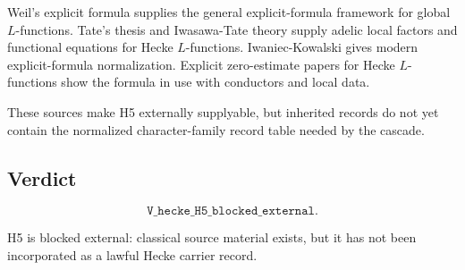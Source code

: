 Weil's explicit formula supplies the general explicit-formula framework for
global \(L\)-functions. Tate's thesis and Iwasawa-Tate theory supply adelic
local factors and functional equations for Hecke \(L\)-functions.
Iwaniec-Kowalski gives modern explicit-formula normalization. Explicit
zero-estimate papers for Hecke \(L\)-functions show the formula in use with
conductors and local data.

These sources make H5 externally supplyable, but inherited records do not yet
contain the normalized character-family record table needed by the cascade.

\subsection*{Verdict}

\[
\texttt{V\_hecke\_H5\_blocked\_external}.
\]

H5 is blocked external: classical source material exists, but it has not been
incorporated as a lawful Hecke carrier record.
